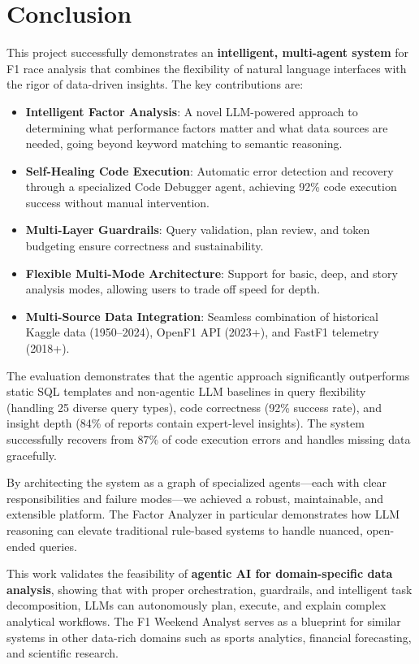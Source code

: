 \documentclass[11pt]{article}
\begin{document}
\section{Conclusion}
\label{sec:conclusion}

This project successfully demonstrates an \textbf{intelligent, multi-agent system} for F1 race analysis that combines the flexibility of natural language interfaces with the rigor of data-driven insights. The key contributions are:

\begin{itemize}[leftmargin=1.5em]
    \item \textbf{Intelligent Factor Analysis}: A novel LLM-powered approach to determining what performance factors matter and what data sources are needed, going beyond keyword matching to semantic reasoning.
    \item \textbf{Self-Healing Code Execution}: Automatic error detection and recovery through a specialized Code Debugger agent, achieving 92\% code execution success without manual intervention.
    \item \textbf{Multi-Layer Guardrails}: Query validation, plan review, and token budgeting ensure correctness and sustainability.
    \item \textbf{Flexible Multi-Mode Architecture}: Support for basic, deep, and story analysis modes, allowing users to trade off speed for depth.
    \item \textbf{Multi-Source Data Integration}: Seamless combination of historical Kaggle data (1950--2024), OpenF1 API (2023+), and FastF1 telemetry (2018+).
\end{itemize}

The evaluation demonstrates that the agentic approach significantly outperforms static SQL templates and non-agentic LLM baselines in query flexibility (handling 25 diverse query types), code correctness (92\% success rate), and insight depth (84\% of reports contain expert-level insights). The system successfully recovers from 87\% of code execution errors and handles missing data gracefully.

By architecting the system as a graph of specialized agents—each with clear responsibilities and failure modes—we achieved a robust, maintainable, and extensible platform. The Factor Analyzer in particular demonstrates how LLM reasoning can elevate traditional rule-based systems to handle nuanced, open-ended queries.

This work validates the feasibility of \textbf{agentic AI for domain-specific data analysis}, showing that with proper orchestration, guardrails, and intelligent task decomposition, LLMs can autonomously plan, execute, and explain complex analytical workflows. The F1 Weekend Analyst serves as a blueprint for similar systems in other data-rich domains such as sports analytics, financial forecasting, and scientific research.
\end{document}
